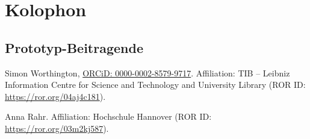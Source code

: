 \documentclass[
  a4paper,
  openany]{book}
\begin{document}

\chapter{Kolophon}\label{kolophon}

\section{Prototyp-Beitragende}\label{prototyp-beitragende}

Simon Worthington, \href{https://orcid.org/0000-0002-8579-9717}{ORCiD:
0000-0002-8579-9717}. Affiliation: TIB -- Leibniz Information Centre for
Science and Technology and University Library (ROR ID:
\url{https://ror.org/04aj4c181}).

Anna Rahr. Affiliation: Hochschule Hannover (ROR ID:
\url{https://ror.org/03m2kj587}).


\backmatter

\printindex







\bigbreak





\vfill

\vspace{1\baselineskip} 

\begin{tcolorbox}
\centering


\end{tcolorbox}
\end{document}
